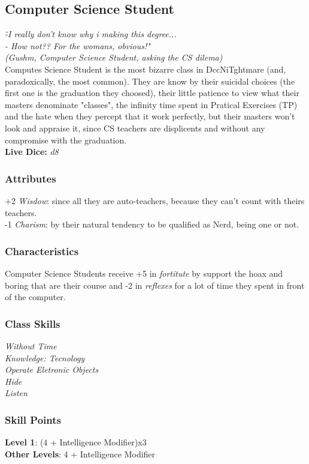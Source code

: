 \documentclass[ letterpaper,12pt]{article}
\begin{document}
\subsection{Computer Science Student}
{\it 
\"-I really don't know why i making this degree...\\
- How not?? For the womans, obvious!"\\
(Gushm, Computer Science Student, asking the CS dilema)}\\

Computes Science Student is the most bizarre class in DccNiTghtmare (and, paradoxically, the most common). They are know by their suicidal choices (the first one is the graduation they choosed), their little patience to view what their masters denominate "classes", the infinity time spent in Pratical Exercises (TP) and the hate when they percept that it work perfectly, but their masters won't look and appraise it, since CS teachers are displicents and without any compromise with the graduation.\\

{\bf Live Dice:} {\it d8}

\subsubsection{Attributes}
+2 {\it Wisdow}: since all they are auto-teachers, because they can't count with theirs teachers.\\
-1 {\it Charism}: by their natural tendency to be qualified as Nerd, being one or not.

\subsubsection{Characteristics}
Computer Science Students receive +5 in {\it fortitute} by support the hoax and boring that are their course and -2 in {\it reflexes} for a lot of time they spent in front of the computer.

\subsubsection{Class Skills}
{\it
Without Time\\
Knowledge: Tecnology\\
Operate Eletronic Objects\\
Hide\\
Listen\\}

\subsubsection{Skill Points}
{\bf Level 1}: (4 + Intelligence Modifier)x3\\
{\bf Other Levels}: 4 + Intelligence Modifier\\
\end{document}
